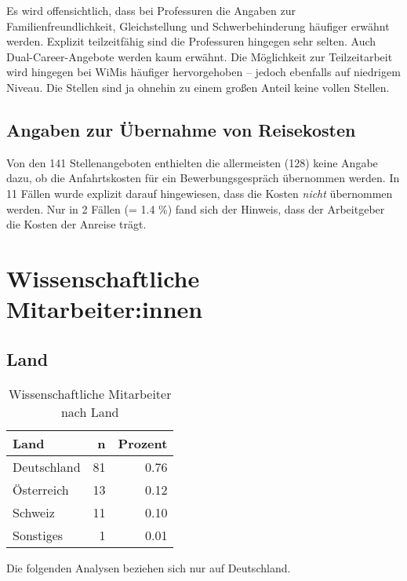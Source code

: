 \documentclass[
]{article}
\begin{document}
Es wird offensichtlich, dass bei Professuren die Angaben zur Familienfreundlichkeit, Gleichstellung und Schwerbehinderung häufiger erwähnt werden. Explizit teilzeitfähig sind die Professuren hingegen sehr selten. Auch Dual-Career-Angebote werden kaum erwähnt. Die Möglichkeit zur Teilzeitarbeit wird hingegen bei WiMis häufiger hervorgehoben -- jedoch ebenfalls auf niedrigem Niveau. Die Stellen sind ja ohnehin zu einem großen Anteil keine vollen Stellen.

\hypertarget{angaben-zur-uxfcbernahme-von-reisekosten}{%
\subsection{Angaben zur Übernahme von Reisekosten}\label{angaben-zur-uxfcbernahme-von-reisekosten}}

Von den 141 Stellenangeboten enthielten die allermeisten (128) keine Angabe dazu, ob die Anfahrtskosten für ein Bewerbungsgespräch übernommen werden. In 11 Fällen wurde explizit darauf hingewiesen, dass die Kosten \emph{nicht} übernommen werden. Nur in 2 Fällen (= 1.4 \%) fand sich der Hinweis, dass der Arbeitgeber die Kosten der Anreise trägt.

\hypertarget{wissenschaftliche-mitarbeiterinnen}{%
\section{Wissenschaftliche Mitarbeiter:innen}\label{wissenschaftliche-mitarbeiterinnen}}

\hypertarget{land}{%
\subsection{Land}\label{land}}

\begin{table}[H]

\caption{\label{tab:unnamed-chunk-1}Wissenschaftliche Mitarbeiter nach Land}
\centering
\begin{tabular}[t]{l|r|r}
\hline
Land & n & Prozent\\
\hline
Deutschland & 81 & 0.76\\
\hline
Österreich & 13 & 0.12\\
\hline
Schweiz & 11 & 0.10\\
\hline
Sonstiges & 1 & 0.01\\
\hline
\end{tabular}
\end{table}

Die folgenden Analysen beziehen sich nur auf Deutschland.
\end{document}
